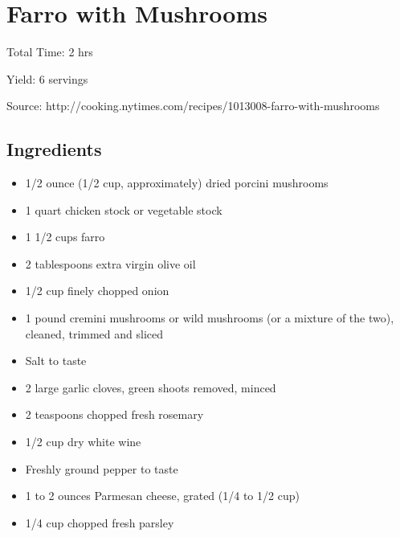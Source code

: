 \section{Farro with Mushrooms}

\begin{center}
Total Time: 2 hrs

\noindent Yield: 6 servings

\vspace{1em}

Source: http://cooking.nytimes.com/recipes/1013008-farro-with-mushrooms
\end{center}

\subsection{Ingredients}
\begin{multicols}{2}
\begin{itemize}
    \item 1/2 ounce (1/2 cup, approximately) dried porcini mushrooms
    \item 1 quart chicken stock or vegetable stock
    \item 1 1/2 cups farro
    \item 2 tablespoons extra virgin olive oil
    \item 1/2 cup finely chopped onion
    \item 1 pound cremini mushrooms or wild mushrooms (or a mixture of the two), cleaned, trimmed and sliced
    \item Salt to taste
    \item 2 large garlic cloves, green shoots removed, minced
    \item 2 teaspoons chopped fresh rosemary
    \item 1/2 cup dry white wine
    \item Freshly ground pepper to taste
    \item 1 to 2 ounces Parmesan cheese, grated (1/4 to 1/2 cup)
    \item 1/4 cup chopped fresh parsley
\end{itemize}
\end{multicols}

